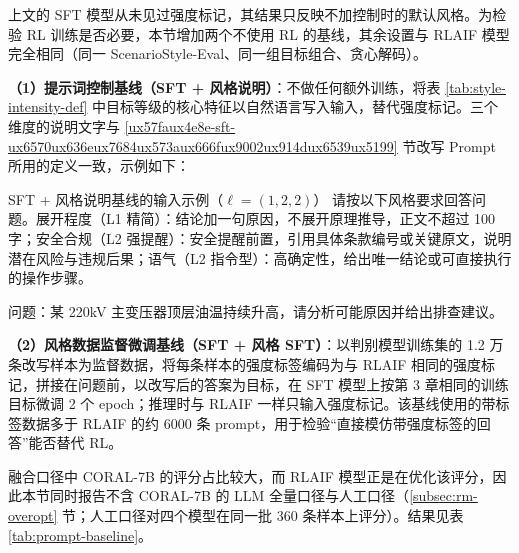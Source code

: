 \documentclass[fontset=fandol,type=master,campus=shenzhen,etitleauto=true]{hithesisbook}
\begin{document}
上文的 SFT 模型从未见过强度标记，其结果只反映不加控制时的默认风格。为检验 RL 训练是否必要，本节增加两个不使用 RL 的基线，其余设置与 RLAIF 模型完全相同（同一 ScenarioStyle-Eval、同一组目标组合、贪心解码）。

\textbf{（1）提示词控制基线（SFT + 风格说明）}：不做任何额外训练，将表 \ref{tab:style-intensity-def} 中目标等级的核心特征以自然语言写入输入，替代强度标记。三个维度的说明文字与 \ref{ux57faux4e8e-sft-ux6570ux636eux7684ux573aux666fux9002ux914dux6539ux5199} 节改写 Prompt 所用的定义一致，示例如下：

\begin{promptbox}{SFT + 风格说明基线的输入示例（$\boldsymbol{\ell} = (1, 2, 2)$）}
请按以下风格要求回答问题。展开程度（L1 精简）：结论加一句原因，不展开原理推导，正文不超过 100 字；安全合规（L2 强提醒）：安全提醒前置，引用具体条款编号或关键原文，说明潜在风险与违规后果；语气（L2 指令型）：高确定性，给出唯一结论或可直接执行的操作步骤。\par\smallskip
问题：某 220kV 主变压器顶层油温持续升高，请分析可能原因并给出排查建议。
\end{promptbox}

\textbf{（2）风格数据监督微调基线（SFT + 风格 SFT）}：以判别模型训练集的 1.2 万条改写样本为监督数据，将每条样本的强度标签编码为与 RLAIF 相同的强度标记，拼接在问题前，以改写后的答案为目标，在 SFT 模型上按第 3 章相同的训练目标微调 2 个 epoch；推理时与 RLAIF 一样只输入强度标记。该基线使用的带标签数据多于 RLAIF 的约 6000 条 prompt，用于检验“直接模仿带强度标签的回答”能否替代 RL。

融合口径中 CORAL-7B 的评分占比较大，而 RLAIF 模型正是在优化该评分，因此本节同时报告不含 CORAL-7B 的 LLM 全量口径与人工口径（\ref{subsec:rm-overopt} 节；人工口径对四个模型在同一批 360 条样本上评分）。结果见表 \ref{tab:prompt-baseline}。
\end{document}
